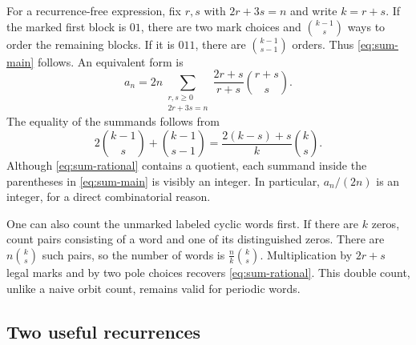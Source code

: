 \documentclass[11pt,letterpaper]{article}
\numberwithin{equation}{section}
\theoremstyle{definition}
\theoremstyle{remark}
\begin{document}
For a recurrence-free expression, fix $r,s$ with $2r+3s=n$ and
write $k=r+s$. If the marked first block is $01$, there are two
mark choices and
$\binom{k-1}{s}$ ways to order the remaining blocks. If it is
$011$, there are $\binom{k-1}{s-1}$ orders. Thus
\eqref{eq:sum-main} follows. An equivalent form is
\begin{equation}\label{eq:sum-rational}
 \boxed{\displaystyle
 a_n=2n\!\sum_{\substack{r,s\ge0\\2r+3s=n}}
       \frac{2r+s}{r+s}\binom{r+s}{s}.}
\end{equation}
The equality of the summands follows from
\[
 2\binom{k-1}{s}+\binom{k-1}{s-1}
 =\frac{2(k-s)+s}{k}\binom{k}{s}.
\]
Although \eqref{eq:sum-rational} contains a quotient, each summand
inside the parentheses in \eqref{eq:sum-main} is visibly an integer.
In particular, $a_n/(2n)$ is an integer, for a direct combinatorial
reason.

One can also count the unmarked labeled cyclic words first. If
there are $k$ zeros, count pairs consisting of a word and one of
its distinguished zeros. There are $n\binom{k}{s}$ such pairs,
so the number of words is $\frac{n}{k}\binom{k}{s}$.
Multiplication by $2r+s$ legal marks and by two pole choices
recovers \eqref{eq:sum-rational}. This double count, unlike a
naive orbit count, remains valid for periodic words.

\subsection{Two useful recurrences}
\end{document}
